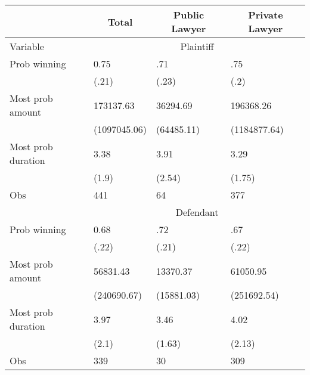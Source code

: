 \begin{tabular}{rrrr}
\toprule
      & \multicolumn{1}{c}{Total} & \multicolumn{1}{c}{Public Lawyer} & \multicolumn{1}{c}{Private Lawyer} \\
\midrule
\multicolumn{1}{l}{Variable} & \multicolumn{3}{c}{Plaintiff} \\
\midrule
\midrule
\multicolumn{1}{l}{Prob winning} & \multicolumn{1}{l}{0.75} & \multicolumn{1}{l}{.71} & \multicolumn{1}{l}{.75} \\
\multicolumn{1}{l}{} & \multicolumn{1}{l}{(.21)} & \multicolumn{1}{l}{(.23)} & \multicolumn{1}{l}{(.2)} \\
\multicolumn{1}{l}{Most prob amount} & \multicolumn{1}{l}{173137.63} & \multicolumn{1}{l}{36294.69} & \multicolumn{1}{l}{196368.26} \\
\multicolumn{1}{l}{} & \multicolumn{1}{l}{(1097045.06)} & \multicolumn{1}{l}{(64485.11)} & \multicolumn{1}{l}{(1184877.64)} \\
\multicolumn{1}{l}{Most prob duration} & \multicolumn{1}{l}{3.38} & \multicolumn{1}{l}{3.91} & \multicolumn{1}{l}{3.29} \\
\multicolumn{1}{l}{} & \multicolumn{1}{l}{(1.9)} & \multicolumn{1}{l}{(2.54)} & \multicolumn{1}{l}{(1.75)} \\
\multicolumn{1}{l}{Obs} & \multicolumn{1}{l}{441} & \multicolumn{1}{l}{64} & \multicolumn{1}{l}{377} \\
\midrule
\multicolumn{1}{l}{} & \multicolumn{3}{c}{Defendant} \\
\midrule
\midrule
\multicolumn{1}{l}{Prob winning} & \multicolumn{1}{l}{0.68} & \multicolumn{1}{l}{.72} & \multicolumn{1}{l}{.67} \\
\multicolumn{1}{l}{} & \multicolumn{1}{l}{(.22)} & \multicolumn{1}{l}{(.21)} & \multicolumn{1}{l}{(.22)} \\
\multicolumn{1}{l}{Most prob amount} & \multicolumn{1}{l}{56831.43} & \multicolumn{1}{l}{13370.37} & \multicolumn{1}{l}{61050.95} \\
\multicolumn{1}{l}{} & \multicolumn{1}{l}{(240690.67)} & \multicolumn{1}{l}{(15881.03)} & \multicolumn{1}{l}{(251692.54)} \\
\multicolumn{1}{l}{Most prob duration} & \multicolumn{1}{l}{3.97} & \multicolumn{1}{l}{3.46} & \multicolumn{1}{l}{4.02} \\
\multicolumn{1}{l}{} & \multicolumn{1}{l}{(2.1)} & \multicolumn{1}{l}{(1.63)} & \multicolumn{1}{l}{(2.13)} \\
\multicolumn{1}{l}{Obs} & \multicolumn{1}{l}{339} & \multicolumn{1}{l}{30} & \multicolumn{1}{l}{309} \\
\bottomrule
\bottomrule
\end{tabular}%
